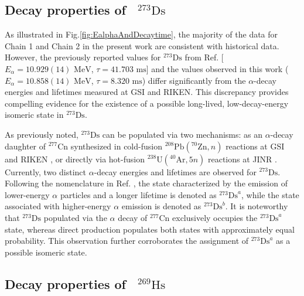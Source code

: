 \documentclass[final,5p,times,twocolumn,number,sort&compress]{elsarticle}
\begin{document}
\subsection{\texorpdfstring{Decay properties of~ $^{273}\mathrm{Ds}$}{Decay properties of 273Ds}}

As illustrated in Fig.\ref{fig:EalphaAndDecaytime}, the majority of the data for Chain 1 and Chain 2 in the present work are consistent with historical data.
 However, the previously reported values for $^{273}\text{Ds}$ from Ref.\cite{oganessian2024SynthesisDecayProperties}  [$E_{\alpha} = 10.929(14)\text{ MeV}$,
  $\tau = 41.703\text{ ms}$] and the values observed in this work ($E_{\alpha} = 10.858(14)\text{ MeV}$, $\tau = 8.320\text{ ms}$) differ significantly from the $\alpha$-decay energies and lifetimes measured at GSI and RIKEN. 
  This discrepancy provides compelling evidence for the existence of a possible long-lived, low-decay-energy isomeric state in $^{273}\text{Ds}$.

As previously noted, $^{273}\text{Ds}$ can be populated via two mechanisms: as an $\alpha$-decay daughter of $^{277}\text{Cn}$ synthesized in cold-fusion $^{208}\text{Pb}(^{70}\text{Zn}, n)$ reactions at GSI \cite{hofmann2002NewResultsElements,hofmann1996NewElement112}  and RIKEN \cite{sumita2013NewResultProduction,morita2007ExperimentSynthesisIsotope277}, or directly via hot-fusion $^{238}\text{U}(^{40}\text{Ar}, 5n)$ reactions at JINR \cite{oganessian2024SynthesisDecayProperties}. Currently, two distinct $\alpha$-decay energies and lifetimes are observed for $^{273}\text{Ds}$. Following the nomenclature in Ref. \cite{oganessian2024SynthesisDecayProperties}, the state characterized by the emission of lower-energy $\alpha$ particles and a longer lifetime is denoted as $^{273}\text{Ds}^{a}$, while the state associated with higher-energy $\alpha$ emission is denoted as $^{273}\text{Ds}^{b}$. It is noteworthy that $^{273}\text{Ds}$ populated via the $\alpha$ decay of $^{277}\text{Cn}$ exclusively occupies the $^{273}\text{Ds}^{a}$ state, whereas direct production populates both states with approximately equal probability. This observation further corroborates the assignment of $^{273}\text{Ds}^{a}$ as a possible isomeric state.

\subsection{\texorpdfstring{Decay properties of~ $^{269}\mathrm{Hs}$}{Decay properties of 269Hs}}
\end{document}
